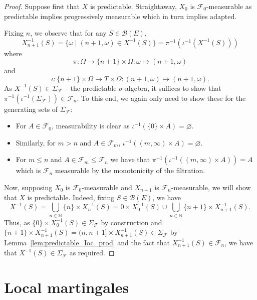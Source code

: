 \begin{proof}\leanok
Suppose first that $X$ is predictable. Straightaway, $X_0$ is $\mathcal{F}_0$-measurable as predictable implies progressively measurable which in turn implies adapted.

Fixing $n$, we observe that for any $S \in \mathcal{B}(E)$,
$$X_{n + 1}^{-1}(S) = \{\omega \mid (n + 1, \omega) \in X^{-1}(S)\} = \pi^{-1}(\iota^{-1}(X^{-1}(S)))$$
where
$$\pi : \Omega \to \{n + 1\} \times \Omega : \omega \mapsto (n + 1, \omega)$$
and
$$\iota : \{n + 1\} \times \Omega \to T \times \Omega : (n + 1, \omega) \mapsto (n + 1, \omega).$$
As $X^{-1}(S) \in \Sigma_{\mathcal{F}}$ -- the predictable $\sigma$-algebra, it suffices to show that $\pi^{-1}(\iota^{-1}(\Sigma_{\mathcal{F}})) \in \mathcal{F}_n$. To this end, we again only need to show these for the generating sets of $\Sigma_{\mathcal{F}}$:
\begin{itemize}
    \item For $A \in \mathcal{F}_0$, measurability is clear as $\iota^{-1}(\{0\} \times A) = \varnothing$.
    \item Similarly, for $m > n$ and $A \in \mathcal{F}_m$, $\iota^{-1}((m, \infty) \times A) = \varnothing$.
    \item For $m \le n$ and $A \in \mathcal{F}_m \le \mathcal{F}_n$ we have that $\pi^{-1}(\iota^{-1}((m, \infty) \times A)) = A$ which is $\mathcal{F}_n$ measurable by the monotonicity of the filtration.
\end{itemize}

Now, supposing $X_0$ is $\mathcal{F}_0$-measurable and $X_{n + 1}$ is $\mathcal{F}_n$-measurable, we will show that $X$ is predictable. Indeed, fixing $S \in \mathcal{B}(E)$, we have
$$X^{-1}(S) = \bigcup_{n \in \mathbb{N}} \{n\} \times X_n^{-1}(S) = {0} \times X_0^{-1}(S) \cup \bigcup_{n \in \mathbb{N}} \{n + 1\} \times X_{n + 1}^{-1}(S).$$
Thus, as $\{0\} \times X_0^{-1}(S) \in \Sigma_{\mathcal{F}}$ by construction and $\{n + 1\} \times X_{n + 1}^{-1}(S) = (n, n + 1] \times X_{n + 1}^{-1}(S) \in \Sigma_{\mathcal{F}}$ by Lemma~\ref{lem:predictable_Ioc_prod} and the fact that $X_{n + 1}^{-1}(S) \in \mathcal{F}_n$, we have that $X^{-1}(S) \in \Sigma_{\mathcal{F}}$ as required.
\end{proof}



\section{Local martingales}


